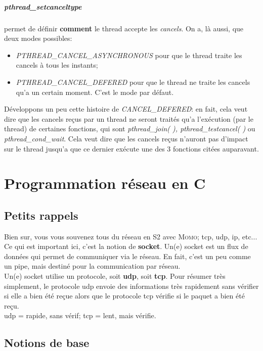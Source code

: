 \documentclass{report}
\begin{document}
\paragraph{pthread\_setcanceltype} permet de définir \textbf{comment} le thread accepte les \emph{cancels}. On a, là aussi, que deux modes possibles:
\begin{itemize}
\item{\emph{PTHREAD\_CANCEL\_ASYNCHRONOUS} pour que le thread traite les cancels à tous les instants;}
\item{\emph{PTHREAD\_CANCEL\_DEFERED} pour que le thread ne traite les cancels qu'a un certain moment. C'est le mode par défaut.}
\end{itemize}
Développons un peu cette histoire de \emph{CANCEL\_DEFERED}: en fait, cela veut dire que les cancels reçus par un thread ne seront traités qu'a l'exécution (par le thread) de certaines fonctions, qui sont \emph{pthread\_join( ), pthread\_testcancel( )} ou \emph{pthread\_cond\_wait}. Cela veut dire que les cancels reçus n'auront pas d'impact sur le thread jusqu'a que ce dernier exécute une des 3 fonctions citées auparavant.



\chapter{Programmation réseau en C}
\section{Petits rappels}
Bien sur, vous vous souvenez tous du réseau en S2 avec \textsc{Momo}; tcp, udp, ip, etc...\\
Ce qui est important ici, c'est la notion de \textbf{socket}. Un(e) socket est un flux de données qui permet de communiquer via le réseau. En fait, c'est un peu comme un pipe, mais destiné pour la communication par réseau.\\
Un(e) socket utilise un protocole, soit \textbf{udp}, soit \textbf{tcp}. Pour résumer très simplement, le protocole udp envoie des informations très rapidement sans vérifier si elle a bien été reçue alors que le protocole tcp vérifie si le paquet a bien été reçu.\\
udp = rapide, sans vérif; tcp = lent, mais vérifie.  

\section{Notions de base}
\end{document}
